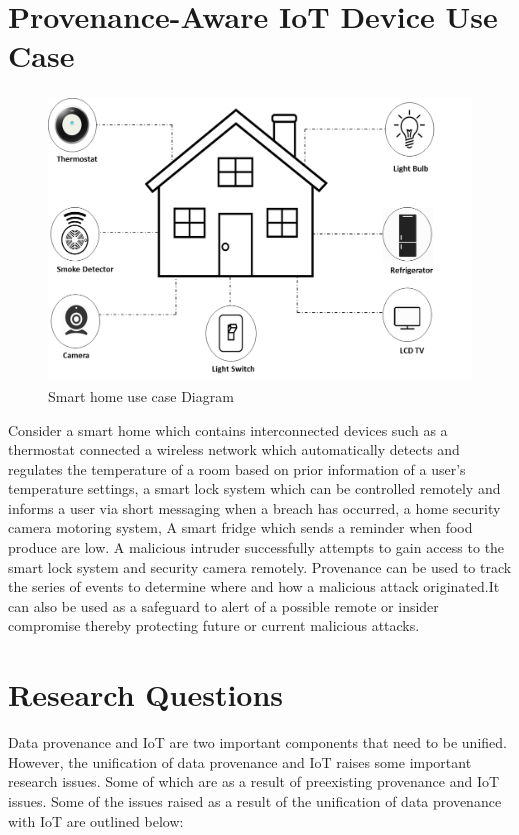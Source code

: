 \section{Provenance-Aware IoT Device Use Case}

\begin{figure}[h]
\begin{center}
\includegraphics[height=3in]{smart_h.png}
\end{center}
\caption{Smart home use case Diagram}
\end{figure}


Consider a smart home which contains interconnected devices such as a thermostat connected a wireless network which automatically detects and regulates the temperature of a room based on prior information of a user's temperature settings, a smart lock system which can be controlled remotely and informs a user via short messaging when a breach has occurred, a home security camera motoring system, A smart fridge which sends a reminder when food produce are low. A malicious intruder successfully attempts  to gain access to the smart lock system and security camera remotely. Provenance can be used to track the series  of events to determine where and how a malicious attack originated.It can also be used as a safeguard to alert of a possible remote or insider compromise thereby protecting future or current malicious attacks. 





\section{Research Questions}
Data provenance and IoT are two important components that need to be unified. However, the unification of data provenance and IoT raises some important research issues. Some of which are as a result of preexisting provenance and IoT issues. Some of the issues raised as a result of the unification of data provenance with IoT are outlined below:

